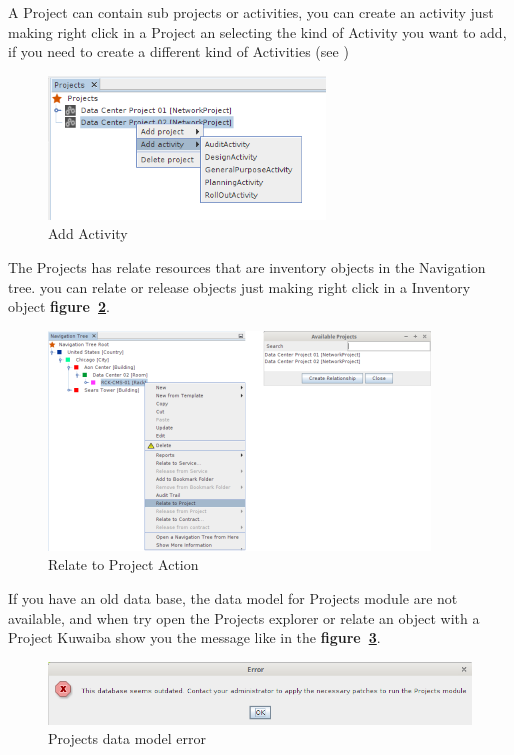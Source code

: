 \documentclass[a4paper]{article}
\begin{document}
		    A Project can contain sub projects or activities, you can create an activity just making right click in a Project an selecting the kind of Activity you want to add, if you need to create a different kind of Activities (see \textbf{})
		    \newline
		    
		    \begin{figure}[h!]
		    	\centering
		    	\includegraphics[width=0.5\linewidth]{img/activity_actions.png}
		    	\caption{Add Activity}
		    	\label{fig:activity_actions}
		    \end{figure}
		    
		    The Projects has relate resources that are inventory objects in the Navigation tree. you can relate or release objects just making right click in a Inventory object \textbf{figure~\ref{fig:pm_relate_to_project}}.
		    \newline
		    		    
		    \begin{figure}[h!]
		    	\centering
		    	\includegraphics[width=0.9\linewidth]{img/pm_relate_to_project.png}
		    	\caption{Relate to Project Action}
		    	\label{fig:pm_relate_to_project}
		    \end{figure}
		    
		    If you have an old data base, the data model for Projects module are not available, and when try open the Projects explorer or relate an object with a Project
		    Kuwaiba show you the message like in the \textbf{figure~\ref{fig:patch_projects}}.
		    \newline
		    
		    \begin{figure}[h!]
		    	\centering
		    	\includegraphics[width=0.8\linewidth]{img/patch_projects.png}
		    	\caption{Projects data model error}
		    	\label{fig:patch_projects}
		    \end{figure}
				
				
\end{document}
